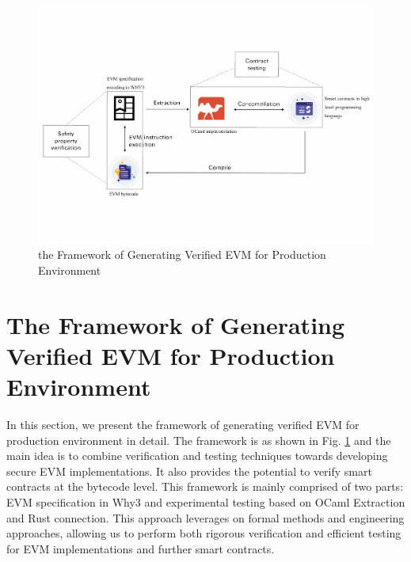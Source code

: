 \documentclass[runningheads]{llncs}
\begin{document}
\begin{figure}[t]
  \centering
  \includegraphics[scale=0.4]{framework.pdf}
  \caption{the Framework of Generating Verified EVM for Production Environment}
  \label{fig:evm1}
\end{figure}

\section{The Framework of Generating Verified EVM for Production Environment}\label{Sec: Framework}
In this section, we present the framework of generating verified EVM for production environment in detail. The framework is as shown in Fig. \ref{fig:evm1} and the main idea is to combine verification and testing techniques towards developing secure EVM implementations.
It also provides the potential to verify smart contracts at the bytecode level.  This framework is mainly comprised of two parts: EVM specification in Why3 and experimental testing based on OCaml Extraction and Rust connection. This approach leverages on formal methods and engineering approaches, allowing us to perform both rigorous verification and efficient testing for EVM implementations and further smart contracts. 
\end{document}
